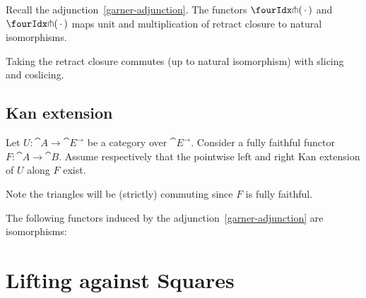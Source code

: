 \documentclass[reqno,10pt,a4paper,oneside]{amsart}
\begin{document}
\begin{lemma}
\label{retract-closure}
Recall the adjunction~\eqref{garner-adjunction}.
The functors $\liftr{\brarghole}$ and $\liftl{\brarghole}$ maps unit and multiplication of retract closure to natural isomorphisms.
\end{lemma}

\begin{remark}
\label{retract-closure-slicing}
Taking the retract closure commutes (up to natural isomorphism) with slicing and coslicing.
\end{remark}

\subsection{Kan extension}

Let $U : \cat{A} \to \cat{E}^{\to}$ be a category over $\cat{E}^{\to}$.
Consider a fully faithful functor $F : \cat{A} \to \cat{B}$.
Assume respectively that the pointwise left and right Kan extension of $U$ along $F$ exist.
Note the triangles will be (strictly) commuting since $F$ is fully faithful.

\begin{lemma}
\label{kan-extension-closure}
The following functors induced by the adjunction~\eqref{garner-adjunction} are isomorphisms:
\end{lemma}

\section{Lifting against Squares}
\end{document}
